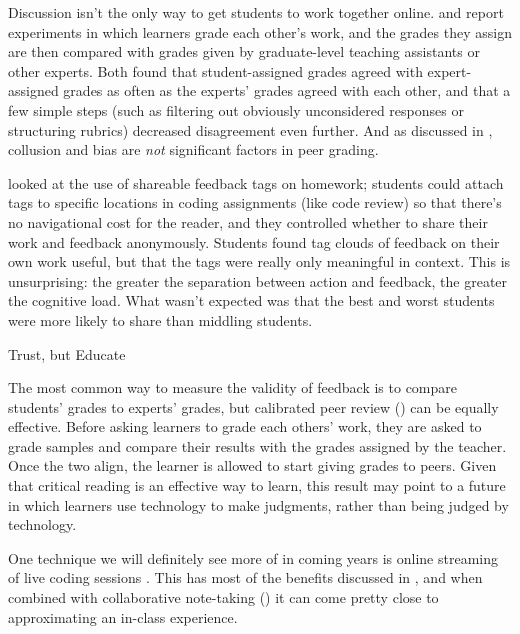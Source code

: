 Discussion isn't the only way to get students to work together online.
\cite{Pare2008} and \cite{Kulk2013} report experiments in which
learners grade each other's work, and the grades they assign are then
compared with grades given by graduate-level teaching assistants or
other experts. Both found that student-assigned grades agreed with
expert-assigned grades as often as the experts' grades agreed with
each other, and that a few simple steps (such as filtering out
obviously unconsidered responses or structuring rubrics) decreased
disagreement even further.  And as discussed in
, collusion and bias are \emph{not}
significant factors in peer grading.

\cite{Cumm2011} looked at the use of shareable feedback tags on
homework; students could attach tags to specific locations in coding
assignments (like code review) so that there's no navigational cost
for the reader, and they controlled whether to share their work and
feedback anonymously.  Students found tag clouds of feedback on their
own work useful, but that the tags were really only meaningful in
context.  This is unsurprising: the greater the separation between
action and feedback, the greater the cognitive load.  What wasn't
expected was that the best and worst students were more likely to
share than middling students.

\begin{callout}{Trust, but Educate}

  The most common way to measure the validity of feedback is to
  compare students' grades to experts' grades, but calibrated peer
  review () can be equally effective.
  Before asking learners to grade each others' work, they are asked to
  grade samples and compare their results with the grades assigned by
  the teacher.  Once the two align, the learner is allowed to start
  giving grades to peers.  Given that critical reading is an effective
  way to learn, this result may point to a future in which learners
  use technology to make judgments, rather than being judged by
  technology.

\end{callout}

One technique we will definitely see more of in coming years is online
streaming of live coding sessions \cite{Haar2017}. This has most of
the benefits discussed in , and when
combined with collaborative note-taking
() it can come pretty close to
approximating an in-class experience.

